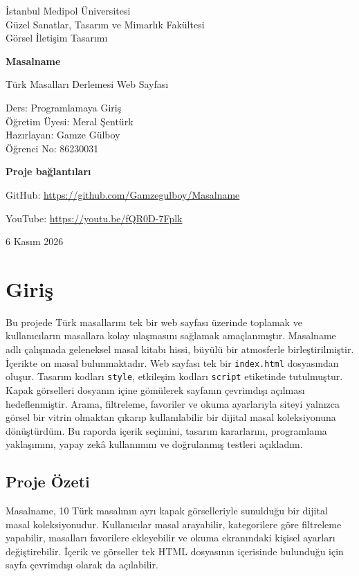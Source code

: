 \documentclass[10pt,a4paper]{article}
\begin{document}
\begin{titlepage}\centering
\vspace*{2cm}
{\large İstanbul Medipol Üniversitesi\\ Güzel Sanatlar, Tasarım ve Mimarlık Fakültesi\\ Görsel İletişim Tasarımı\par}
\vspace{1.8cm}
{\Huge\bfseries Masalname\par}\vspace{.4cm}
{\Large Türk Masalları Derlemesi Web Sayfası\par}\vspace{.6cm}{\Large Vize Raporu\par}
\vspace{1.5cm}
{\large Ders: Programlamaya Giriş\\ Öğretim Üyesi: Meral Şentürk\\ Hazırlayan: Gamze Gülboy\\ Öğrenci No: 86230031\par}
\vfill
\textbf{Proje bağlantıları}\par
GitHub: \url{https://github.com/Gamzegulboy/Masalname}\par
YouTube: \url{https://youtu.be/fQR0D-7Fplk}\par
\vspace{1cm}6 Kasım 2026\par
\end{titlepage}
\tableofcontents\clearpage
\section{Giriş}
Bu projede Türk masallarını tek bir web sayfası üzerinde toplamak ve kullanıcıların masallara kolay ulaşmasını sağlamak amaçlanmıştır. Masalname adlı çalışmada geleneksel masal kitabı hissi, büyülü bir atmosferle birleştirilmiştir. İçerikte on masal bulunmaktadır. Web sayfası tek bir \texttt{index.html} dosyasından oluşur. Tasarım kodları \texttt{style}, etkileşim kodları \texttt{script} etiketinde tutulmuştur. Kapak görselleri dosyanın içine gömülerek sayfanın çevrimdışı açılması hedeflenmiştir. Arama, filtreleme, favoriler ve okuma ayarlarıyla siteyi yalnızca görsel bir vitrin olmaktan çıkarıp kullanılabilir bir dijital masal koleksiyonuna dönüştürdüm. Bu raporda içerik seçimini, tasarım kararlarını, programlama yaklaşımını, yapay zekâ kullanımını ve doğrulanmış testleri açıkladım.
\subsection{Proje Özeti}
Masalname, 10 Türk masalının ayrı kapak görselleriyle sunulduğu bir dijital masal koleksiyonudur. Kullanıcılar masal arayabilir, kategorilere göre filtreleme yapabilir, masalları favorilere ekleyebilir ve okuma ekranındaki kişisel ayarları değiştirebilir. İçerik ve görseller tek HTML dosyasının içerisinde bulunduğu için sayfa çevrimdışı olarak da açılabilir.
\end{document}
